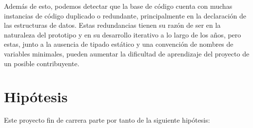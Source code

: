 Además de esto, podemos detectar que la base de código cuenta con muchas instancias de código duplicado o redundante, principalmente en la declaración de las estructuras de datos. Estas redundancias tienen su razón de ser en la naturaleza del prototipo y en su desarrollo iterativo a lo largo de los años, pero estas, junto a la ausencia de tipado estático y una convención de nombres de variables minimales, pueden aumentar la dificultad de aprendizaje del proyecto de un posible contribuyente.

\section{Hipótesis}

Este proyecto fin de carrera parte por tanto de la siguiente hipótesis:
\\ \\
\noindent{}
